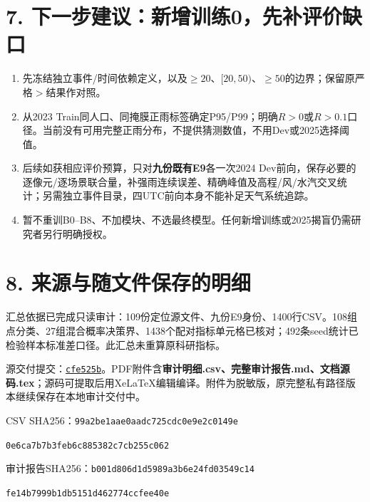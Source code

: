 \documentclass[UTF8,a4paper,10pt,fontset=none]{ctexart}
\begin{document}
\section*{7. 下一步建议：新增训练0，先补评价缺口}
\begin{enumerate}
\item 先冻结独立事件/时间依赖定义，以及$\ge20$、$[20,50)$、$\ge50$的边界；保留原严格$>$结果作对照。
\item 从2023 Train同人口、同掩膜正雨标签确定P95/P99；明确$R>0$或$R>0.1$口径。当前没有可用完整正雨分布，不提供猜测数值，不用Dev或2025选择阈值。
\item 后续如获相应评价预算，只对\textbf{九份既有E9}各一次2024 Dev前向，保存必要的逐像元/逐场景联合量，补强雨连续误差、精确峰值及高程/风/水汽交叉统计；另需独立事件目录，四UTC前向本身不能补足天气系统追踪。
\item 暂不重训B0--B8、不加模块、不选最终模型。任何新增训练或2025揭盲仍需研究者另行明确授权。
\end{enumerate}

\section*{8. 来源与随文件保存的明细}
汇总依据已完成只读审计：109份定位源文件、九份E9身份、1400行CSV。108组点分类、27组混合概率决策界、1438个配对指标单元格已核对；492条seed统计已检验样本标准差口径。此汇总未重算原科研指标。

源交付提交：\href{https://github.com/flyeagle-cex/YunTAPR-Net/commit/cfe525b30db6fc7c36c578d7904da9238d71e7cd}{\texttt{cfe525b}}。PDF附件含\textbf{审计明细.csv、完整审计报告.md、文档源码.tex}；源码可提取后用XeLaTeX编辑编译。附件为脱敏版，原完整私有路径版本继续保存在本地审计交付中。

{\scriptsize CSV SHA256：\texttt{99a2be1aae0aadc725cdc0e9e2c0149e}\par\texttt{0e6ca7b7b3feb6c885382c7cb255c062}\par
审计报告SHA256：\texttt{b001d806d1d5989a3b6e24fd03549c14}\par\texttt{fe14b7999b1db5151d462774ccfee40e}}
\end{document}

